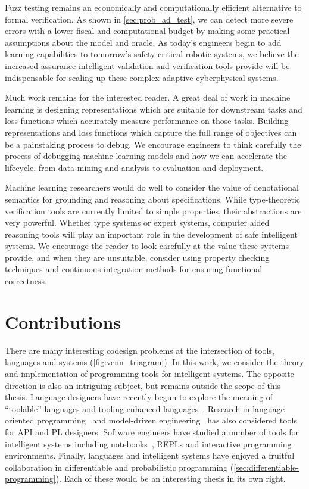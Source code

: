 Fuzz testing remains an economically and computationally efficient alternative to formal verification. As shown in \autoref{sec:prob_ad_test}, we can detect more severe errors with a lower fiscal and computational budget by making some practical assumptions about the model and oracle. As today's engineers begin to add learning capabilities to tomorrow's safety-critical robotic systems, we believe the increased assurance intelligent validation and verification tools provide will be indispensable for scaling up these complex adaptive cyberphysical systems.

Much work remains for the interested reader. A great deal of work in machine learning is designing representations which are suitable for downstream tasks and loss functions which accurately measure performance on those tasks. Building representations and loss functions which capture the full range of objectives can be a painstaking process to debug. We encourage engineers to think carefully the process of debugging machine learning models and how we can accelerate the lifecycle, from data mining and analysis to evaluation and deployment.

Machine learning researchers would do well to consider the value of denotational semantics for grounding and reasoning about specifications. While type-theoretic verification tools are currently limited to simple properties, their abstractions are very powerful. Whether type systems or expert systems, computer aided reasoning tools will play an important role in the development of safe intelligent systems. We encourage the reader to look carefully at the value these systems provide, and when they are unsuitable, consider using property checking techniques and continuous integration methods for ensuring functional correctness.

\section{Contributions}

There are many interesting codesign problems at the intersection of tools, languages and systems (\autoref{fig:venn_triagram}). In this work, we consider the theory and implementation of programming tools for intelligent systems. The opposite direction is also an intriguing subject, but remains outside the scope of this thesis. Language designers have recently begun to explore the meaning of ``toolable'' languages and tooling-enhanced languages~\citep{chatley2019next}. Research in language oriented programming~\citep{dmitriev2004language} and model-driven engineering~\citep{famelis2015mummint} has also considered tools for API and PL designers. Software engineers have studied a number of tools for intelligent systems including notebooks~\citep{chattopadhyays2020notebooks}, REPLs and interactive programming environments. Finally, languages and intelligent systems have enjoyed a fruitful collaboration in differentiable and probabilistic programming (\autoref{sec:differentiable-programming}). Each of these would be an interesting thesis in its own right.

